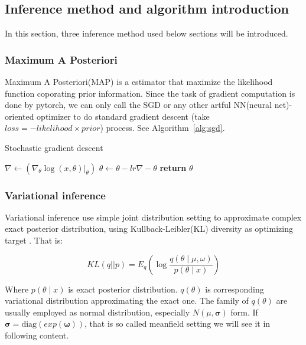\documentclass{article}
\begin{document}
\subsection{Inference method and algorithm introduction}

In this section, three inference method used below sections will be introduced.

\subsubsection{Maximum A Posteriori}

Maximum A Posteriori(MAP) is a estimator that maximize the likelihood function 
coporating prior information. Since the task of gradient computation is done by pytorch, 
we can only call the SGD or any other artful NN(neural net)-oriented optimizer to do standard gradient 
descent (take $loss = -likelihood \times prior$) process. See Algorithm~\ref{alg:sgd}.


\begin{algorithm}
\caption{Stochastic gradient descent}
\begin{algorithmic}[1]
 
        \State $\nabla \gets (\nabla_\theta \log(x,\theta)|_{\theta})$
        \State $\theta \gets \theta - lr \nabla -\theta$
    \EndFor
    \State \textbf{return} $\theta$
\EndProcedure
\end{algorithmic}
\label{alg:sgd}
\end{algorithm}

\subsubsection{Variational inference}

Variational inference use simple joint distribution setting to approximate complex 
exact posterior distribution, using Kullback-Leibler(KL) diversity as optimizing target \cite{blei2017variational}. That is:

$$
KL(q||p) = E_q \left( \log \frac{q(\theta \mid \mu,\omega)}{p(\theta \mid x)} \right)
$$

Where $p(\theta \mid x)$ is exact posterior distribution. 
$q(\theta)$ is corresponding variational distribution approximating the exact one.
The family of $q(\theta)$ are usually employed as normal distribution, especially $N(\mu,\mathbf{\sigma})$ form.
If $\mathbf{\sigma}=\mathrm{diag}(exp(\mathbf{\omega}))$, 
that is so called meanfield setting we will see it in following content.
\end{document}
